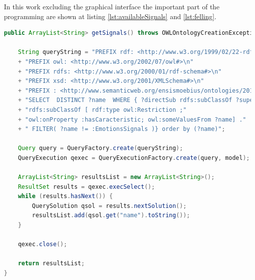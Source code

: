 \documentclass[conference]{IEEEtran}
\begin{document}
In this work excluding the graphical interface the important part of the programming are shown at listing \ref{lst:availableSignals} and \ref{lst:felling}.
\begin{lstlisting}[language=java, caption={Retrieve all available signals method}, label={lst:availableSignals}]
	public ArrayList<String> getSignals() throws OWLOntologyCreationException {

	String queryString = "PREFIX rdf: <http://www.w3.org/1999/02/22-rdf-syntax-ns#>\n"
	+ "PREFIX owl: <http://www.w3.org/2002/07/owl#>\n"
	+ "PREFIX rdfs: <http://www.w3.org/2000/01/rdf-schema#>\n"
	+ "PREFIX xsd: <http://www.w3.org/2001/XMLSchema#>\n"
	+ "PREFIX : <http://www.semanticweb.org/ensismoebius/ontologies/2019/9/tellingLies#>\n"
	+ "SELECT  DISTINCT ?name  WHERE { ?directSub rdfs:subClassOf ?super ;"
	+ "rdfs:subClassOf [ rdf:type owl:Restriction ;"
	+ "owl:onProperty :hasCaracteristic; owl:someValuesFrom ?name] ."
	+ "	FILTER( ?name != :EmotionsSignals )} order by (?name)";
	
	Query query = QueryFactory.create(queryString);
	QueryExecution qexec = QueryExecutionFactory.create(query, model);
	
	ArrayList<String> resultsList = new ArrayList<String>();
	ResultSet results = qexec.execSelect();
	while (results.hasNext()) {
		QuerySolution qsol = results.nextSolution();
		resultsList.add(qsol.get("name").toString());
	}
	
	qexec.close();
	
	return resultsList;
}
\end{lstlisting}
\end{document}
